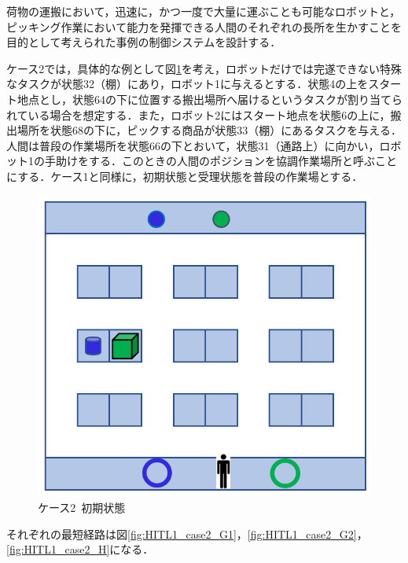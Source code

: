 荷物の運搬において，迅速に，かつ一度で大量に運ぶことも可能なロボットと，ピッキング作業において能力を発揮できる人間のそれぞれの長所を生かすことを目的として考えられた事例の制御システムを設計する．

ケース2では，具体的な例として図\ref{fig:HITL1_case2}を考え，ロボットだけでは完遂できない特殊なタスクが状態32（棚）にあり，ロボット1に与えるとする．状態4の上をスタート地点とし，状態64の下に位置する搬出場所へ届けるというタスクが割り当てられている場合を想定する．また，ロボット2にはスタート地点を状態6の上に，搬出場所を状態68の下に，ピックする商品が状態33（棚）にあるタスクを与える．
人間は普段の作業場所を状態66の下とおいて，状態31（通路上）に向かい，ロボット1の手助けをする．このときの人間のポジションを協調作業場所と呼ぶことにする．ケース1と同様に，初期状態と受理状態を普段の作業場とする．

\begin{figure}[!t]
    \centering
    \includegraphics[scale=0.3]{figures/HITL1_case2.png}
    \caption{ケース2\ 初期状態}
    \label{fig:HITL1_case2}
\end{figure}

それぞれの最短経路は図\ref{fig:HITL1_case2_G1}，\ref{fig:HITL1_case2_G2}，\ref{fig:HITL1_case2_H}になる．

